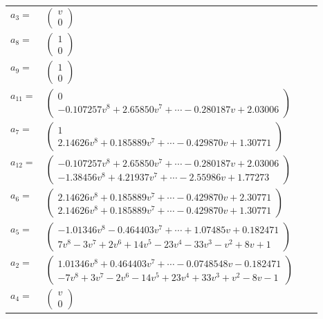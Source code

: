 \documentclass[1p]{elsarticle_modified}
\theoremstyle{definition}
\begin{document}
\begin{tabular}{m{7pt} m{180pt} m{7pt} m{180pt} }
\flushright $a_{3}=$&$\begin{pmatrix}v\\0\end{pmatrix}$ \\
\flushright $a_{8}=$&$\begin{pmatrix}1\\0\end{pmatrix}$ \\
\flushright $a_{9}=$&$\begin{pmatrix}1\\0\end{pmatrix}$ \\
\flushright $a_{11}=$&$\begin{pmatrix}0\\-0.107257 v^{8}+2.65850 v^{7}+\cdots-0.280187 v+2.03006\end{pmatrix}$ \\
\flushright $a_{7}=$&$\begin{pmatrix}1\\2.14626 v^{8}+0.185889 v^{7}+\cdots-0.429870 v+1.30771\end{pmatrix}$ \\
\flushright $a_{12}=$&$\begin{pmatrix}-0.107257 v^{8}+2.65850 v^{7}+\cdots-0.280187 v+2.03006\\-1.38456 v^{8}+4.21937 v^{7}+\cdots-2.55986 v+1.77273\end{pmatrix}$ \\
\flushright $a_{6}=$&$\begin{pmatrix}2.14626 v^{8}+0.185889 v^{7}+\cdots-0.429870 v+2.30771\\2.14626 v^{8}+0.185889 v^{7}+\cdots-0.429870 v+1.30771\end{pmatrix}$ \\
\flushright $a_{5}=$&$\begin{pmatrix}-1.01346 v^{8}-0.464403 v^{7}+\cdots+1.07485 v+0.182471\\7 v^8-3 v^7+2 v^6+14 v^5-23 v^4-33 v^3- v^2+8 v+1\end{pmatrix}$ \\
\flushright $a_{2}=$&$\begin{pmatrix}1.01346 v^{8}+0.464403 v^{7}+\cdots-0.0748548 v-0.182471\\-7 v^8+3 v^7-2 v^6-14 v^5+23 v^4+33 v^3+v^2-8 v-1\end{pmatrix}$ \\
\flushright $a_{4}=$&$\begin{pmatrix}v\\0\end{pmatrix}$ \\

\end{tabular}
\end{document}
